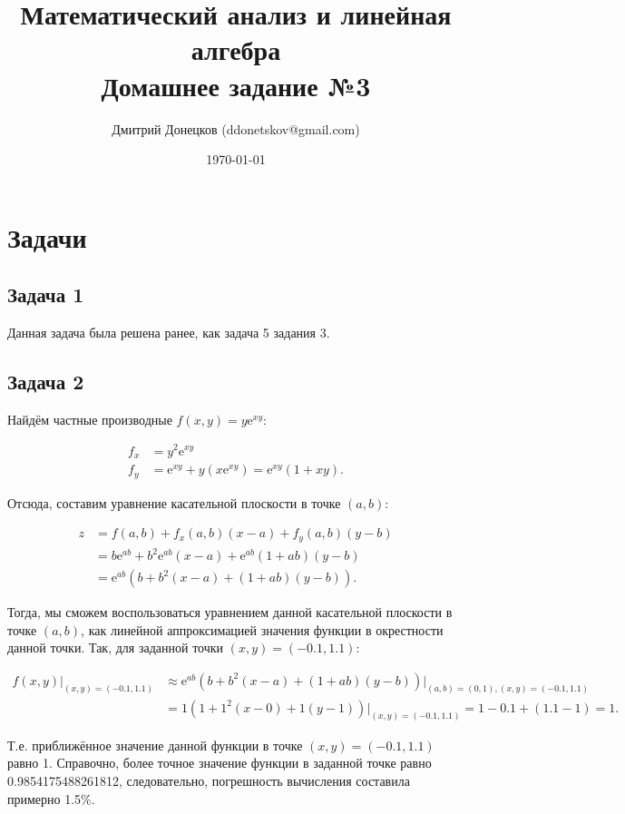 \documentclass[a4paper,11pt]{article}
\title{\vspace{-1.5cm}Математический анализ и линейная алгебра \\
Домашнее задание №3}
\author{Дмитрий Донецков (ddonetskov@gmail.com)}
\date{\today}
\newcommand{\e}{\mathrm{e}}
\begin{document}
\maketitle

\section{Задачи}

\subsection{Задача 1}

Данная задача была решена ранее, как задача 5 задания 3.

\subsection{Задача 2}

Найдём частные производные $f(x,y) = y \e^{xy}$:

\begin{align*}
f_x & = y^2 \e^{xy} \\
f_y & = \e^{xy} + y(x\e^{xy}) = \e^{xy}(1+xy).
\end{align*}

Отсюда, составим уравнение касательной плоскости в точке $(a,b)$:

\begin{align*}
z & = f(a, b) + f_x(a, b)(x-a) + f_y(a, b)(y-b) \\
  & = b \e^{ab} + b^2 \e^{ab} (x-a) + \e^{ab}(1+ab)(y-b) \\
  & = \e^{ab} (b + b^2 (x-a) + (1+ab)(y-b)).
\end{align*}

Тогда, мы сможем воспользоваться уравнением данной касательной плоскости в точке $(a,b)$, как линейной аппроксимацией значения функции в окрестности данной точки. Так, для заданной точки $(x,y)  = (-0.1, 1.1)$:

\begin{align*}
f(x, y) \bigg \rvert_{(x, y) = (-0.1, 1.1)} & \approx \e^{ab} (b + b^2 (x-a) + (1+ab)(y-b)) \bigg \rvert_{(a,b) = (0,1), (x, y) = (-0.1, 1.1)} \\
 & = 1 (1 + 1^2(x-0) + 1(y-1)) \rvert_{(x, y) = (-0.1, 1.1)} = 1 - 0.1 + (1.1 -1) = 1.
\end{align*}

Т.е. приближённое значение данной функции в точке $(x,y) = (-0.1, 1.1)$ равно 1. Справочно, более точное значение функции в заданной точке равно 0.9854175488261812, следовательно, погрешность вычисления составила примерно 1.5\%.
\end{document}
